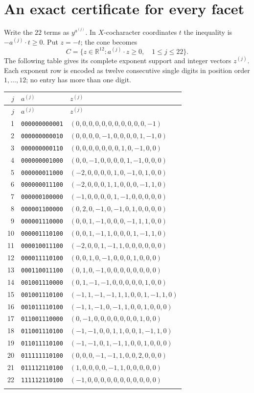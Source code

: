 \documentclass[11pt]{article}
\newcommand{\R}{\mathbb R}
\begin{document}
\section{An exact certificate for every facet}
Write the $22$ terms as $y^{a^{(j)}}$. In $X$-cocharacter coordinates $t$ the
inequality is $-a^{(j)}\cdot t\ge0$. Put $z=-t$; the cone becomes
\[
 C=\{z\in\R^{12}:a^{(j)}\cdot z\ge0,\quad1\le j\le22\}.
\]
The following table gives its complete exponent support and integer vectors
$z^{(j)}$. Each exponent row is encoded as twelve consecutive single digits
in position order $1,\ldots,12$; no entry has more than one digit.

\begingroup\footnotesize
\setlength{\tabcolsep}{5pt}
\begin{longtable}{rll}
\toprule
$j$&$a^{(j)}$&$z^{(j)}$\\ \midrule
\endfirsthead
\toprule $j$&$a^{(j)}$&$z^{(j)}$\\ \midrule
\endhead
1 & \texttt{000000000001} & $(0,0,0,0,0,0,0,0,0,0,0,-1)$ \\
2 & \texttt{000000000010} & $(0,0,0,0,-1,0,0,0,0,1,-1,0)$ \\
3 & \texttt{000000000110} & $(0,0,0,0,0,0,0,1,0,-1,0,0)$ \\
4 & \texttt{000000001000} & $(0,0,-1,0,0,0,0,1,-1,0,0,0)$ \\
5 & \texttt{000000011000} & $(-2,0,0,0,0,1,0,-1,0,1,0,0)$ \\
6 & \texttt{000000011100} & $(-2,0,0,0,1,1,0,0,0,-1,1,0)$ \\
7 & \texttt{000000100000} & $(-1,0,0,0,0,1,-1,0,0,0,0,0)$ \\
8 & \texttt{000001100000} & $(0,2,0,-1,0,-1,0,1,0,0,0,0)$ \\
9 & \texttt{000001110000} & $(0,0,1,-1,0,0,0,-1,1,1,0,0)$ \\
10 & \texttt{000001110100} & $(0,0,1,-1,1,0,0,0,1,-1,1,0)$ \\
11 & \texttt{000010011100} & $(-2,0,0,1,-1,1,0,0,0,0,0,0)$ \\
12 & \texttt{000011110100} & $(0,0,1,0,-1,0,0,0,1,0,0,0)$ \\
13 & \texttt{000110011100} & $(0,1,0,-1,0,0,0,0,0,0,0,0)$ \\
14 & \texttt{001001110000} & $(0,1,-1,-1,0,0,0,0,0,1,0,0)$ \\
15 & \texttt{001001110100} & $(-1,1,-1,-1,1,1,0,0,1,-1,1,0)$ \\
16 & \texttt{001011110100} & $(-1,1,-1,0,-1,1,0,0,1,0,0,0)$ \\
17 & \texttt{011001110000} & $(0,-1,0,0,0,0,0,0,0,1,0,0)$ \\
18 & \texttt{011001110100} & $(-1,-1,0,0,1,1,0,0,1,-1,1,0)$ \\
19 & \texttt{011011110100} & $(-1,-1,0,1,-1,1,0,0,1,0,0,0)$ \\
20 & \texttt{011111110100} & $(0,0,0,-1,-1,1,0,0,2,0,0,0)$ \\
21 & \texttt{011112110100} & $(1,0,0,0,0,-1,1,0,0,0,0,0)$ \\
22 & \texttt{111112110100} & $(-1,0,0,0,0,0,0,0,0,0,0,0)$ \\
\\[-9pt]\bottomrule
\end{longtable}
\end{document}
